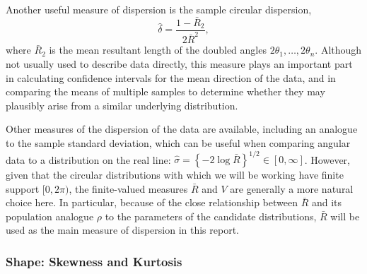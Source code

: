 \documentclass[../../ArchStats.tex]{subfiles}
\begin{document}
Another useful measure of dispersion is the sample circular dispersion,
\[\hat{\delta} = \frac{1-\bar{R}_2}{2\bar{R}^2},\]
where $\bar{R}_2$ is the mean resultant length of the doubled angles $2\theta_1, \dots, 2\theta_n$. Although not usually used to describe data directly, this measure plays an important part in calculating confidence intervals for the mean direction of the data, and in comparing the means of multiple samples to determine whether they may plausibly arise from a similar underlying distribution. 

Other measures of the dispersion of the data are available, including an analogue to the  sample standard deviation, which can be useful when comparing angular data to a distribution on the real line: $\hat{\sigma} = \left\lbrace -2 \log \bar{R} \right\rbrace ^{1/2} \in [0, \infty]$. However, given that the circular distributions with which we will be working have finite support $[0, 2\pi)$, the finite-valued measures $\bar{R}$ and $V$ are generally a more natural choice here. In particular, because of the close relationship between $\bar{R}$ and its population analogue $\rho$ to the parameters of the candidate distributions, $\bar{R}$ will be used as the main measure of dispersion in this report.

 



\subsubsection{Shape: Skewness and Kurtosis}
\label{sec:shape}

\end{document}
